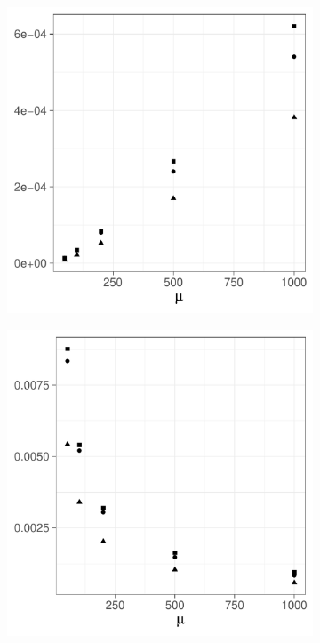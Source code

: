 \begin{figure}[htbp]
    \centering
    \begin{subfigure}[b]{0.49\textwidth}
        \includegraphics[width=\textwidth]{results/by_num_cases/MISE-vs-cases}
        \label{fig:ise:unif_NCases_1h:mise}
    \end{subfigure}
    \begin{subfigure}[b]{0.49\textwidth}
        \includegraphics[width=\textwidth]{results/by_num_cases/RMISE-vs-cases}
        \label{fig:ise:unif_NCases_1h:rmise}
    \end{subfigure}


\end{figure}
